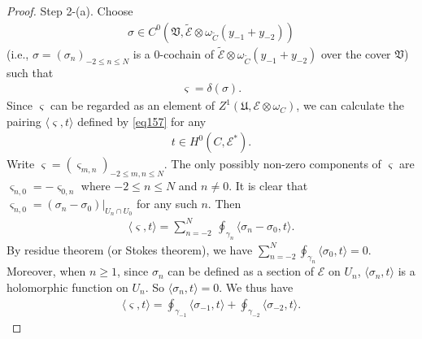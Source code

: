 \documentclass[12pt,b5paper,notitlepage]{report}
\theoremstyle{definition}
\theoremstyle{plain}
\newcommand{\fk}{\mathfrak}
\newcommand{\wtd}{\widetilde}
\newcommand{\bk}[1]{\langle {#1}\rangle}
\newcommand{\scr}{\mathscr}
\newcommand{\sgm}{\varsigma}
\numberwithin{equation}{section}
\begin{document}
\begin{proof}
Step 2-(a). Choose 
\begin{align*}
\sigma\in C^0(\fk V,\wtd{\scr E}\otimes \omega_{\wtd C}(y_{-1}+y_{-2}))
\end{align*}
(i.e., $\sigma=(\sigma_n)_{-2\leq n\leq N}$ is a $0$-cochain of $\wtd{\scr E}\otimes \omega_{\wtd C}(y_{-1}+y_{-2})$ over the cover $\fk V$) such that
\begin{align*}
\sgm=\delta(\sigma).
\end{align*}
Since $\sgm$ can be regarded as an element of $Z^1(\fk U,\scr E\otimes\omega_C)$, we can  calculate the pairing $\bk{\sgm,t}$ defined by \eqref{eq157} for any
\begin{align*}
t\in H^0(C,\scr E^*).
\end{align*}
Write $\sgm=(\sgm_{m,n})_{-2\leq m,n\leq N}$. The only possibly non-zero components of $\sgm$ are $\sgm_{n,0}=-\sgm_{0,n}$ where $-2\leq n\leq N$ and $n\neq 0$. It is clear that $\sgm_{n,0}=(\sigma_n-\sigma_0)|_{U_n\cap U_0}$ for any such $n$. Then
\begin{align*}
\bk{\sgm,t}=\sum_{n=-2}^N~\oint_{\gamma_n}\bk{\sigma_n-\sigma_0,t}.
\end{align*}
By residue theorem (or Stokes theorem), we have $\sum_{n=-2}^{N}\oint_{\gamma_n}\bk{\sigma_0,t}=0$. Moreover, when $n\geq 1$, since $\sigma_n$ can be defined as a section of $\scr E$ on $U_n$, $\bk{\sigma_n,t}$ is a holomorphic function on $U_n$. So $\bk{\sigma_n,t}=0$. We thus have
\begin{align*}
\bk{\sgm,t}=\oint_{\gamma_{-1}}\bk{\sigma_{-1},t}+\oint_{\gamma_{-2}}\bk{\sigma_{-2},t}.
\end{align*}


\end{proof}
\end{document}
